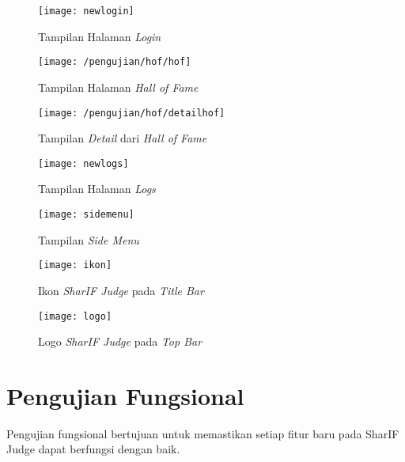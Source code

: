 \begin{enumerate}
	\begin{figure}[H]
		\centering  
		\texttt{[image: newlogin]}  
		\caption[Tampilan Halaman Login]{Tampilan Halaman \textit{Login}} 
		\label{fig:newlogin} 
	\end{figure}
	
	\begin{figure}[H]
		\centering  
		\texttt{[image: /pengujian/hof/hof]}  
		\caption[Tampilan Halaman Hall of Fame]{Tampilan Halaman \textit{Hall of Fame}} 
		\label{fig:newhof} 
	\end{figure}

	\begin{figure}[H]
		\centering  
		\texttt{[image: /pengujian/hof/detailhof]}  
		\caption[Tampilan Detail dari Hall of Fame]{Tampilan \textit{Detail} dari \textit{Hall of Fame}} 
		\label{fig:newhofdetail} 
	\end{figure}

	\begin{figure}[H]
		\centering  
		\texttt{[image: newlogs]}  
		\caption[Tampilan Halaman Logs]{Tampilan Halaman \textit{Logs}} 
		\label{fig:newlogs} 
	\end{figure}

	\begin{figure}[H]
		\centering  
		\texttt{[image: sidemenu]}  
		\caption[Tampilan Side Menu]{Tampilan \textit{Side Menu}} 
		\label{fig:sidemenu} 
	\end{figure}

	\begin{figure}[H]
		\centering  
		\texttt{[image: ikon]}  
		\caption[Ikon \textit{SharIF Judge} pada \textit{Title Bar}]{Ikon \textit{SharIF Judge} pada \textit{Title Bar}} 
		\label{fig:ikons} 
	\end{figure} 
	
	\begin{figure}[H]
		\centering  
		\texttt{[image: logo]}  
		\caption[Logo \textit{SharIF Judge} pada \textit{Top Bar}]{Logo \textit{SharIF Judge} pada \textit{Top Bar}} 
		\label{fig:logos} 
	\end{figure} 
\end{enumerate}

\section{Pengujian Fungsional}
Pengujian fungsional bertujuan untuk memastikan setiap fitur baru pada SharIF Judge dapat berfungsi dengan baik.
